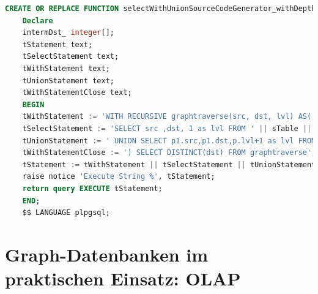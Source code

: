 \begin{lstlisting}[language=SQL,caption = SQL Standard SQL Mittel,frame=single, label={StandardSQL} ]
    CREATE OR REPLACE FUNCTION selectWithUnionSourceCodeGenerator_withDepth(sTable text, startingNode integer, depth integer ) RETURNS SETOF integer AS $$
    Declare
    intermDst_ integer[];
    tStatement text;
    tSelectStatement text;
    tWithStatement text;
    tUnionStatement text;
    tWithStatementClose text;
    BEGIN
    tWithStatement := 'WITH RECURSIVE graphtraverse(src, dst, lvl) AS(';
    tSelectStatement := 'SELECT src ,dst, 1 as lvl FROM ' || sTable || ' WHERE src ='||startingNode;
    tUnionStatement := ' UNION SELECT p1.src,p1.dst,p.lvl+1 as lvl FROM graphtraverse p, ' || sTable || ' p1 WHERE p1.src IN ( p.dst ) and lvl<'||depth;
    tWithStatementClose := ') SELECT DISTINCT(dst) FROM graphtraverse';
    tStatement := tWithStatement || tSelectStatement || tUnionStatement || tWithStatementClose;
    raise notice 'Execute String %', tStatement;
    return query EXECUTE tStatement;
    END;
    $$ LANGUAGE plpgsql;
\end{lstlisting}

\section{Graph-Datenbanken im praktischen Einsatz: OLAP}
